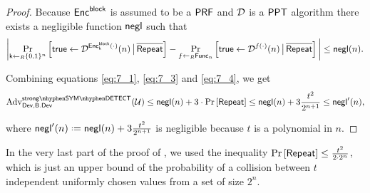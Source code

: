 \begin{proof}
Because $\operatorname{\mathsf{Enc}^{\mathsf{block}}}$ is assumed to be a $\mathsf{PRF}$ and $\operatorname{\mathcal{D}}$ is a $\mathsf{PPT}$ algorithm there exists a negligible function $\operatorname{\mathsf{negl}}$ such that 
\begin{align}
\label{eq:7_4}
	\bigg\vert \condprobb{\true\leftarrow\dist^{\Enc{\key}(\cdot)}(n)}{\pneg{\rep}}{\key\unileft\{0,1\}^n} - \condprobb{\true\leftarrow\dist^{f(\cdot)}(n)}{\pneg{\rep}}{f\unileft\func_n} \bigg\vert\leq \negl(n).
\end{align}

Combining equations \ref{eq:7_1}, \ref{eq:7_3} and \ref{eq:7_4}, we get
\begin{align*}
	\adv_{\dev,\bbdev}^{\symstrongdetectplain}(\user) \leq \negl(n) + 3\cdot \prob{\rep} \leq \negl(n) + 3\frac{t^2}{2^{n+1}} \leq \negl'(n),
\end{align*}

where $\negl'(n)\defeq \negl(n) + 3\frac{t^2}{2^{n+1}}$ is negligible because $t$ is a polynomial in $n$. 

\end{proof}

In the very last part of the proof of , we used the inequality $\operatorname{Pr}\left[{\mathsf{Repeat}}\right]\leq \frac{t^2}{2\cdot 2^n}$, which is just an upper bound of the probability of a collision between $t$ independent uniformly chosen values from a set of size $2^n$. 

